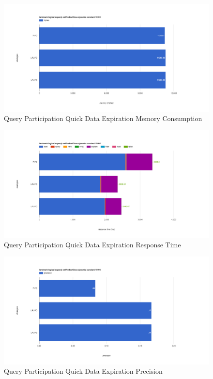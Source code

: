\begin{figure}[!htbp]
	\centering
    \includegraphics[width=6.5in]{img/app3-qp-quick-m.png}
    \caption{Query Participation Quick Data Expiration Memory Consumption}
\end{figure}
\begin{figure}[!htbp]
	\centering
    \includegraphics[width=6.5in]{img/app3-qp-quick-r.png}
    \caption{Query Participation Quick Data Expiration Response Time}
\end{figure}
\begin{figure}[!htbp]
	\centering
    \includegraphics[width=6.5in]{img/app3-qp-quick-p.png}
    \caption{Query Participation Quick Data Expiration Precision}
\end{figure}
